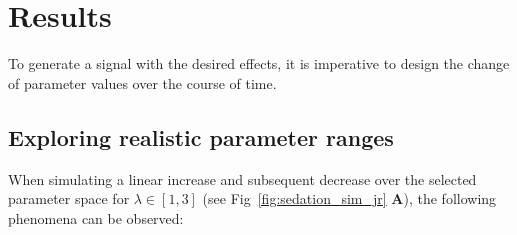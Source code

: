 \chapter{Results}\label{ch:results}
To generate a signal with the desired effects, it is imperative to design the change of parameter values over the
course of time.






%

%
%
%
%
%

\section{Exploring realistic parameter ranges}\label{sec:simulation-over-the-parameter-space}

When simulating a linear increase and subsequent decrease over the selected parameter space for
$ \lambda \in \left[ 1, 3 \right] $ (see Fig~\ref{fig:sedation_sim_jr} \textbf{A}),
the following phenomena can be observed:

